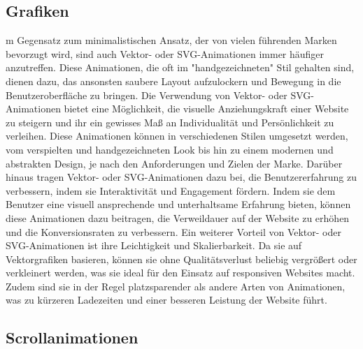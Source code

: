 \subsection{Grafiken}
m Gegensatz zum minimalistischen Ansatz, der von vielen führenden Marken bevorzugt wird, sind auch Vektor- oder SVG-Animationen 
immer häufiger anzutreffen. Diese Animationen, die oft im "handgezeichneten" Stil gehalten sind, dienen dazu, das ansonsten saubere Layout 
aufzulockern und Bewegung in die Benutzeroberfläche zu bringen.
Die Verwendung von Vektor- oder SVG-Animationen bietet eine Möglichkeit, die visuelle Anziehungskraft einer Website zu steigern und ihr 
ein gewisses Maß an Individualität und Persönlichkeit zu verleihen. Diese Animationen können in verschiedenen Stilen umgesetzt werden, 
vom verspielten und handgezeichneten Look bis hin zu einem modernen und abstrakten Design, je nach den Anforderungen und Zielen der Marke.
Darüber hinaus tragen Vektor- oder SVG-Animationen dazu bei, die Benutzererfahrung zu verbessern, indem sie Interaktivität und Engagement 
fördern. Indem sie dem Benutzer eine visuell ansprechende und unterhaltsame Erfahrung bieten, können diese Animationen dazu beitragen, 
die Verweildauer auf der Website zu erhöhen und die Konversionsraten zu verbessern.
Ein weiterer Vorteil von Vektor- oder SVG-Animationen ist ihre Leichtigkeit und Skalierbarkeit. Da sie auf Vektorgrafiken basieren, 
können sie ohne Qualitätsverlust beliebig vergrößert oder verkleinert werden, was sie ideal für den Einsatz auf responsiven Websites 
macht. Zudem sind sie in der Regel platzsparender als andere Arten von Animationen, was zu kürzeren Ladezeiten und einer besseren 
Leistung der Website führt.

\subsection{Scrollanimationen}

